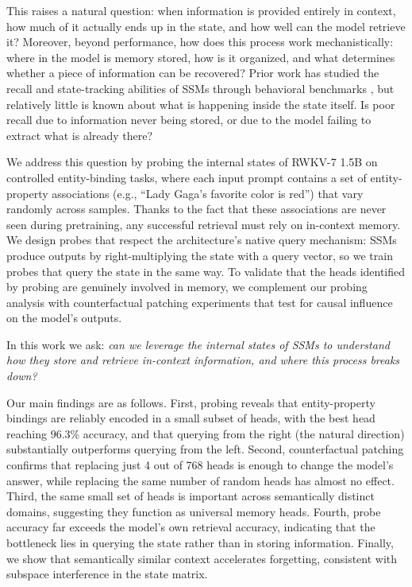 \documentclass[11pt]{article}
\begin{document}
This raises a natural question: when information is provided entirely in context, how much of it actually ends up in the state, and how well can the model retrieve it? Moreover, beyond performance, how does this process work mechanistically: where in the model is memory stored, how is it organized, and what determines whether a piece of information can be recovered? Prior work has studied the recall and state-tracking abilities of SSMs through behavioral benchmarks \cite{jelassi2024repeat,fu2022h3,grazzi2024statetracking}, but relatively little is known about what is happening inside the state itself. Is poor recall due to information never being stored, or due to the model failing to extract what is already there?

We address this question by probing the internal states of RWKV-7 1.5B on controlled entity-binding tasks, where each input prompt contains a set of entity-property associations (e.g., ``Lady Gaga's favorite color is red'') that vary randomly across samples. Thanks to the fact that these associations are never seen during pretraining, any successful retrieval must rely on in-context memory. We design probes that respect the architecture's native query mechanism: SSMs produce outputs by right-multiplying the state with a query vector, so we train probes that query the state in the same way. To validate that the heads identified by probing are genuinely involved in memory, we complement our probing analysis with counterfactual patching experiments that test for causal influence on the model's outputs.

In this work we ask: \emph{can we leverage the internal states of SSMs to understand how they store and retrieve in-context information, and where this process breaks down?}

Our main findings are as follows. First, probing reveals that entity-property bindings are reliably encoded in a small subset of heads, with the best head reaching 96.3\% accuracy, and that querying from the right (the natural direction) substantially outperforms querying from the left. Second, counterfactual patching confirms that replacing just 4 out of 768 heads is enough to change the model's answer, while replacing the same number of random heads has almost no effect. Third, the same small set of heads is important across semantically distinct domains, suggesting they function as universal memory heads. Fourth, probe accuracy far exceeds the model's own retrieval accuracy, indicating that the bottleneck lies in querying the state rather than in storing information. Finally, we show that semantically similar context accelerates forgetting, consistent with subspace interference in the state matrix.
\end{document}
